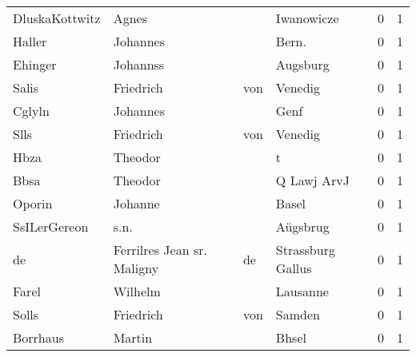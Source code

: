 \documentclass[10pt,a4paper,landscape]{article}
\begin{document}
\begin{longtable}{llllrr}
           DluskaKottwitz &                              Agnes &             &                                  Iwanowicze &          0 &         1 \\
                   Haller &                           Johannes &             &                                      Bern.  &          0 &         1 \\
                  Ehinger &                           Johannss &             &                                    Augsburg &          0 &         1 \\
                    Salis &                          Friedrich &         von &                                     Venedig &          0 &         1 \\
                   Cglyln &                           Johannes &             &                                        Genf &          0 &         1 \\
                     Slls &                          Friedrich &         von &                                     Venedig &          0 &         1 \\
                     Hbza &                            Theodor &             &                                           t &          0 &         1 \\
                     Bbsa &                            Theodor &             &                                 Q Lawj ArvJ &          0 &         1 \\
                   Oporin &                            Johanne &             &                                       Basel &          0 &         1 \\
             SsILerGereon &                               s.n. &             &                                    Aügsbrug &          0 &         1 \\
                       de &         Ferrilres Jean sr. Maligny &          de &                           Strassburg Gallus &          0 &         1 \\
                    Farel &                            Wilhelm &             &                                    Lausanne &          0 &         1 \\
                    Solls &                          Friedrich &         von &                                      Samden &          0 &         1 \\
                 Borrhaus &                             Martin &             &                                       Bhsel &          0 &         1 \\

\end{longtable}
\end{document}
